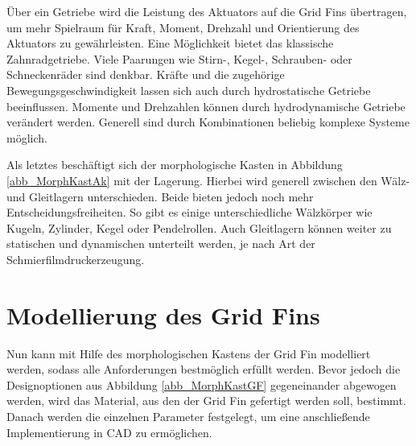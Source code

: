 Über ein Getriebe wird die Leistung des Aktuators auf die Grid Fins übertragen, um mehr Spielraum für Kraft, Moment, Drehzahl und Orientierung des Aktuators zu gewährleisten. Eine Möglichkeit bietet das klassische Zahnradgetriebe. Viele Paarungen wie Stirn-, Kegel-, Schrauben- oder Schneckenräder sind denkbar. Kräfte und die zugehörige Bewegungsgeschwindigkeit lassen sich auch durch hydrostatische Getriebe beeinflussen. Momente und Drehzahlen können durch hydrodynamische Getriebe verändert werden. Generell sind durch Kombinationen beliebig komplexe Systeme möglich.

Als letztes beschäftigt sich der morphologische Kasten in Abbildung \ref{abb_MorphKastAk} mit der Lagerung. Hierbei wird generell zwischen den Wälz- und Gleitlagern unterschieden. Beide bieten jedoch noch mehr Entscheidungsfreiheiten. So gibt es einige unterschiedliche Wälzkörper wie Kugeln, Zylinder, Kegel oder Pendelrollen. Auch Gleitlagern können weiter zu statischen und dynamischen unterteilt werden, je nach Art der Schmierfilmdruckerzeugung.
\section{Modellierung des Grid Fins}
Nun kann mit Hilfe des morphologischen Kastens der Grid Fin modelliert werden, sodass alle Anforderungen bestmöglich erfüllt werden. Bevor jedoch die Designoptionen aus Abbildung \ref{abb_MorphKastGF} gegeneinander abgewogen werden, wird das Material, aus den der Grid Fin gefertigt werden soll, bestimmt. Danach werden die einzelnen Parameter festgelegt, um eine anschließende Implementierung in CAD zu ermöglichen.
